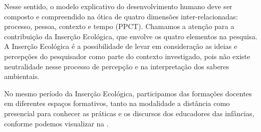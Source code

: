 \documentclass{textolivre-html}
\begin{document}
Nesse sentido, o modelo explicativo do desenvolvimento humano deve ser composto e compreendido na ótica de quatro dimensões inter-relacionadas: processo, pessoa, contexto e tempo (PPCT). Chamamos a atenção para a contribuição da Inserção Ecológica, que envolve os quatro elementos na pesquisa. A Inserção Ecológica \cite{silveira2009,piske2018c,koller2016} é a possibilidade de levar em consideração as ideias e percepções do pesquisador como parte do contexto investigado, pois não existe neutralidade nesse processo de percepção e na interpretação dos saberes ambientais.

No mesmo período da Inserção Ecológica, participamos das formações docentes em diferentes espaços formativos, tanto na modalidade a distância como presencial para conhecer as práticas e os discursos dos educadores das infâncias, conforme podemos visualizar na .  
\end{document}
